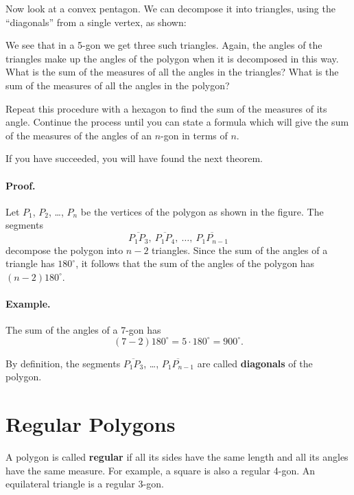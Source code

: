 \documentclass[12pt]{book} %
\begin{document}
Now look at a convex pentagon. We can decompose it into triangles, using the ``diagonals'' from a single vertex, as shown:


We see that in a 5-gon we get three such triangles. Again, the angles of the triangles make up the angles of the polygon when it is decomposed in this way. What is the sum of the measures of all the angles in the triangles? What is the sum of the measures of all the angles in the polygon?

Repeat this procedure with a hexagon to find the sum of the measures of its angle. Continue the process until you can state a formula which will give the sum of the measures of the angles of an $n$-gon in terms of $n$.

If you have succeeded, you will have found the next theorem.


\paragraph{Proof.}
Let $P_1$, $P_2$, \dots, $P_n$ be the vertices of the polygon as shown in the figure. The segments
\[
\overline{P_1P_3},\ \overline{P_1P_4},\ \dots,\ \overline{P_1P_{n-1}}
\]
decompose the polygon into $n-2$ triangles. Since the sum of the angles of a triangle has $180^\circ$, it follows that the sum of the angles of the polygon has $(n-2)180^\circ$.


\paragraph{Example.}
The sum of the angles of a 7-gon has
\[
(7-2)180^\circ=5\cdot 180^\circ=900^\circ.
\]

By definition, the segments $\overline{P_1P_3}$, \dots, $\overline{P_1P_{n-1}}$ are called \textbf{diagonals} of the polygon.

\section{Regular Polygons}

A polygon is called \textbf{regular} if all its sides have the same length and all its angles have the same measure. For example, a square is also a regular 4-gon. An equilateral triangle is a regular 3-gon.
\end{document}
